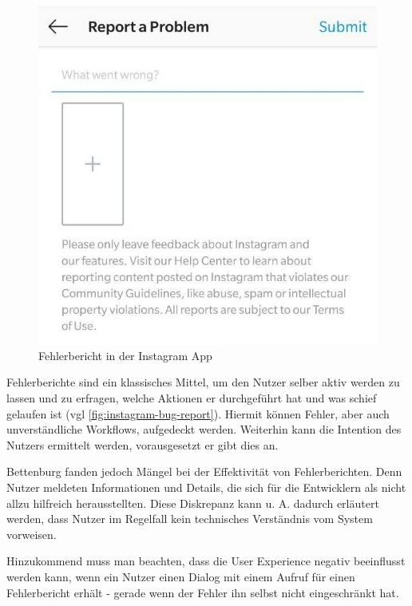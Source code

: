 \begin{figure}
\centering
\vspace{-\baselineskip}
\includegraphics[width=\linewidth]{img/instagram-feedback/instagram-feedback.jpg}
\caption{Fehlerbericht in der Instagram App \cite{Instagram}}
\label{fig:instagram-bug-report}
\end{figure}

Fehlerberichte sind ein klassisches Mittel, um den Nutzer selber aktiv werden zu lassen und zu erfragen, welche Aktionen er durchgeführt hat und was schief gelaufen ist (vgl \autoref{fig:instagram-bug-report}). Hiermit können Fehler, aber auch unverständliche Workflows, aufgedeckt werden. Weiterhin kann die Intention des Nutzers ermittelt werden, vorausgesetzt er gibt dies an.

Bettenburg \etal \cite{WhatMakesAGoodBugReport} fanden jedoch Mängel bei der Effektivität von Fehlerberichten. Denn Nutzer meldeten Informationen und Details, die sich für die Entwicklern als nicht allzu hilfreich herausstellten. Diese Diskrepanz kann u. A. dadurch erläutert werden, dass Nutzer im Regelfall kein technisches Verständnis vom System vorweisen.

Hinzukommend muss man beachten, dass die User Experience negativ beeinflusst werden kann, wenn ein Nutzer einen Dialog mit einem Aufruf für einen Fehlerbericht erhält - gerade wenn der Fehler ihn selbst nicht eingeschränkt hat.

